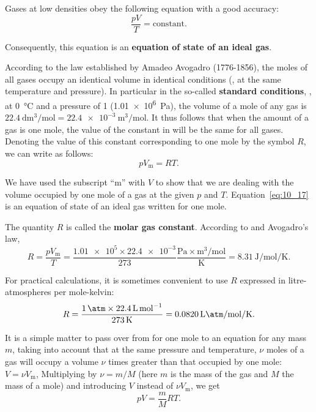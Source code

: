Gases at low densities obey the following equation with a good accuracy:
\begin{equation}\label{eq:10_16}
	\frac{pV}{T} = \text{constant}.
\end{equation}

\noindent
Consequently, this equation is an \textbf{equation of state of an ideal gas}.

According to the law established by Amadeo Avogadro (1776-1856), the moles of all gases occupy an identical volume in identical conditions (\ie, at the same temperature and pressure). In particular in the so-called \textbf{standard conditions}, \ie, at \SI{0}{\degreeCelsius} and a pressure of \SI{1}{\atm} (\SI{1.01e6}{\pascal}), the volume of a mole of any gas is $\SI{22.4}{\deci\metre\cubed\per\mole}=\SI{22.4e-3}{\metre\cubed\per\mole}$. It thus follows that when the amount of a gas is one mole, the value of the constant in  will be the same for all gases. Denoting the value of this constant corresponding to one mole by the symbol $R$, we can write  as follows:
\begin{equation}\label{eq:10_17}
	pV_{\text{m}} = RT.
\end{equation}

\noindent
We have used the subscript ``m'' with $V$ to show that we are dealing with the volume occupied by one mole of a gas at the given $p$ and $T$. Equation~\eqref{eq:10_17} is an equation of state of an ideal gas written for one mole.

The quantity $R$ is called the \textbf{molar gas constant}. According to  and Avogadro's law,
\begin{equation*}
	R = \frac{pV_{\text{m}}}{T} = \frac{\num{1.01e5}\times\num{22.4e-3}}{273}\frac{\si{\pascal}\times\si{\metre\cubed\per\mol}}{\si{\kelvin}} = \SI{8.31}{\joule\per\mole\per\kelvin}.
\end{equation*}

\noindent
For practical calculations, it is sometimes convenient to use $R$ expressed in litre-atmospheres per mole-kelvin:
\begin{equation*}
	R = \frac{\SI{1}{\atm}\times\SI{22.4}{\liter\per\mole}}{\SI{273}{\kelvin}} = \SI{0.0820}{\liter\atm\per\mole\per\kelvin}.
\end{equation*}

It is a simple matter to pass over from  for one mole to an equation for any mass $m$, taking into account that at the same pressure and temperature, $\nu$ moles of a gas will occupy a volume $\nu$ times greater than that occupied by one mole: $V=\nu V_{\text{m}}$, Multiplying  by $\nu=m/M$ (here $m$ is the mass of the gas and $M$ the mass of a mole) and introducing $V$ instead of $\nu V_{\text{m}}$, we get
\begin{equation}\label{eq:10_18}
	pV = \frac{m}{M}RT.
\end{equation}

